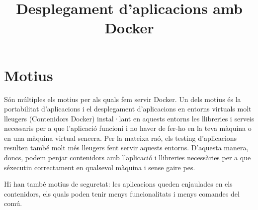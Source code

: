 \documentclass[a4paper]{article}
\begin{document}
\title{Desplegament d'aplicacions amb Docker}
\maketitle

\tableofcontents

%

\begin{comment}
oddsidemargin \the\oddsidemargin \newline
textwidth \the\textwidth \newline
marginparsep \the\marginparsep \newline
marginparwidth \the\marginparwidth \newline
hoffset \the\hoffset \newline
paperwidth \the\paperwidth 
\end{comment}

\section{Motius}
Són múltiples els motius per als quals fem servir Docker. Un dels motius \'{e}s la portabilitat d'aplicacions i el desplegament d'aplicacions en entorns virtuals molt lleugers (Contenidors Docker) instal·lant en aquests entorns les llibreries i serveis necessaris per a que l'aplicació funcioni i no haver de fer-ho en la teva màquina o en una màquina virtual sencera. Per la mateixa raó, els testing d'aplicacions resulten tamb\'{e} molt m\'{e}s lleugers fent servir aquests entorns. D'aquesta manera, doncs, podem penjar contenidors amb l'aplicació i llibreries necessàries per a que s\'{e}xecutin correctament en qualsevol màquina i sense gaire pes.

Hi han tamb\'{e} motius de seguretat: les aplicacions queden enjaulades en els contenidors, els quals poden tenir menys funcionalitats i menys comandes del comú.
\end{document}
